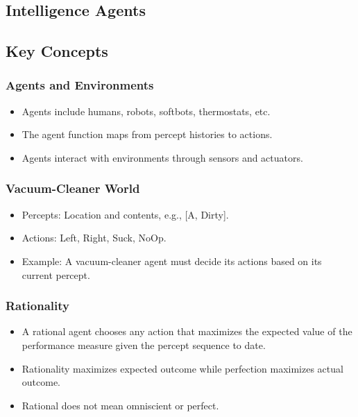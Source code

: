 \documentclass[8pt]{article}
\begin{document}
\subsection{Intelligence Agents}
\subsection{Key Concepts}
\subsubsection{Agents and Environments}
\begin{itemize}
    \item Agents include humans, robots, softbots, thermostats, etc.
    \item The agent function maps from percept histories to actions.
    \item Agents interact with environments through sensors and actuators.
\end{itemize}

\subsubsection{Vacuum-Cleaner World}
\begin{itemize}
    \item Percepts: Location and contents, e.g., [A, Dirty].
    \item Actions: Left, Right, Suck, NoOp.
    \item Example: A vacuum-cleaner agent must decide its actions based on its current percept.
\end{itemize}

\subsubsection{Rationality}
\begin{itemize}
    \item A rational agent chooses any action that maximizes the expected value of the performance measure given the percept sequence to date.
    \item Rationality maximizes expected outcome while perfection maximizes actual outcome.
    \item Rational does not mean omniscient or perfect.
\end{itemize}
\end{document}

